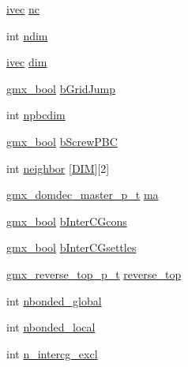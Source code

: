 \begin{DoxyCompactItemize}
\hyperlink{share_2template_2gromacs_2types_2simple_8h_a74f6ffdb4a9c1764f5293969d8c681b6}{ivec} \hyperlink{structgmx__domdec__t_ad19a4aa2d2482809d713f8e871649aaf}{nc}
\item 
int \hyperlink{structgmx__domdec__t_a2dcebb6d090fe173928479ac7ddbf04e}{ndim}
\item 
\hyperlink{share_2template_2gromacs_2types_2simple_8h_a74f6ffdb4a9c1764f5293969d8c681b6}{ivec} \hyperlink{structgmx__domdec__t_acfadef6d7ba6f8d03002eae2a64edc36}{dim}
\item 
\hyperlink{include_2types_2simple_8h_a8fddad319f226e856400d190198d5151}{gmx\-\_\-bool} \hyperlink{structgmx__domdec__t_a9af92fdf3eaafc209423bac575989100}{b\-Grid\-Jump}
\item 
int \hyperlink{structgmx__domdec__t_a41e28abfc32611fbcc26362bc35c238f}{npbcdim}
\item 
\hyperlink{include_2types_2simple_8h_a8fddad319f226e856400d190198d5151}{gmx\-\_\-bool} \hyperlink{structgmx__domdec__t_a6ff026f726377f465e774661f5a0f81f}{b\-Screw\-P\-B\-C}
\item 
int \hyperlink{structgmx__domdec__t_a2f18836c7785e8451093724650cab0ef}{neighbor} \mbox{[}\hyperlink{share_2template_2gromacs_2types_2simple_8h_ac25189db92959bff3c6c2adf4c34b50a}{\-D\-I\-M}\mbox{]}\mbox{[}2\mbox{]}
\item 
\hyperlink{include_2types_2commrec_8h_a8a4fc2204473d6ad28c6b203ad1a9db5}{gmx\-\_\-domdec\-\_\-master\-\_\-p\-\_\-t} \hyperlink{structgmx__domdec__t_a853bfc09ee697c03ddf537028ed215b7}{ma}
\item 
\hyperlink{include_2types_2simple_8h_a8fddad319f226e856400d190198d5151}{gmx\-\_\-bool} \hyperlink{structgmx__domdec__t_a498e307e65cac9be81403fb151449e70}{b\-Inter\-C\-Gcons}
\item 
\hyperlink{include_2types_2simple_8h_a8fddad319f226e856400d190198d5151}{gmx\-\_\-bool} \hyperlink{structgmx__domdec__t_a3fb77a547c82c19eea57d2438dcbce06}{b\-Inter\-C\-Gsettles}
\item 
\hyperlink{include_2types_2commrec_8h_ae9dd80465a6dbf5a88bc7afcdccd1ad9}{gmx\-\_\-reverse\-\_\-top\-\_\-p\-\_\-t} \hyperlink{structgmx__domdec__t_aac4d56164d7c0955ea9341a45d65fa83}{reverse\-\_\-top}
\item 
int \hyperlink{structgmx__domdec__t_a9331bf478566b723d6e136f1ca3befa5}{nbonded\-\_\-global}
\item 
int \hyperlink{structgmx__domdec__t_a3a736711ff1e3afaf8671b94f100dc3c}{nbonded\-\_\-local}
\item 
int \hyperlink{structgmx__domdec__t_a398e320b0196cc53408e44f5e10dd1fc}{n\-\_\-intercg\-\_\-excl}

\end{DoxyCompactItemize}
